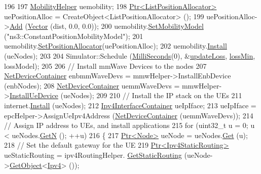 \begin{DoxyCode}
196 
197   \hyperlink{classns3_1_1MobilityHelper}{MobilityHelper} uemobility;
198   \hyperlink{classns3_1_1Ptr}{Ptr<ListPositionAllocator>} uePositionAlloc = 
      CreateObject<ListPositionAllocator> ();
199   uePositionAlloc->\hyperlink{classns3_1_1ListPositionAllocator_a460e82f015ac012a73ba0ea0cccb3486}{Add} (\hyperlink{classns3_1_1Vector3D_a7e59b47bc94c9cb1dadff68c1d0112d8}{Vector} (dist, 0.0, 0.0));
200   uemobility.\hyperlink{classns3_1_1MobilityHelper_a030275011b6f40682e70534d30280aba}{SetMobilityModel} (\textcolor{stringliteral}{"ns3::ConstantPositionMobilityModel"});
201   uemobility.\hyperlink{classns3_1_1MobilityHelper_ac59d5295076be3cc11021566713a28c5}{SetPositionAllocator}(uePositionAlloc);
202   uemobility.\hyperlink{classns3_1_1MobilityHelper_a07737960ee95c0777109cf2994dd97ae}{Install} (ueNodes);
203 
204   Simulator::Schedule (\hyperlink{group__timecivil_gaf26127cf4571146b83a92ee18679c7a9}{MilliSeconds}(0), &\hyperlink{mmwave-epc-amc-test_8cc_adfea4867a62217f5e5e9a8ff5e69a5ad}{updateLoss}, 
      \hyperlink{mmwave-epc-amc-test_8cc_a9ca00a53092f2e9430cb7f39c9831c11}{lossMin}, lossModel);
205 
206   \textcolor{comment}{// Install mmWave Devices to the nodes}
207   \hyperlink{classns3_1_1NetDeviceContainer}{NetDeviceContainer} enbmmWaveDevs = mmwHelper->InstallEnbDevice (enbNodes);
208   \hyperlink{classns3_1_1NetDeviceContainer}{NetDeviceContainer} uemmWaveDevs = mmwHelper->\hyperlink{classns3_1_1MmWaveHelper_a9311c819d7ee539c8710c5b7e98df37a}{InstallUeDevice} (ueNodes);
209 
210   \textcolor{comment}{// Install the IP stack on the UEs}
211   internet.\hyperlink{classns3_1_1InternetStackHelper_a6645b412f31283d2d9bc3d8a95cebbc0}{Install} (ueNodes);
212   \hyperlink{classns3_1_1Ipv4InterfaceContainer}{Ipv4InterfaceContainer} ueIpIface;
213   ueIpIface = epcHelper->AssignUeIpv4Address (\hyperlink{classns3_1_1NetDeviceContainer}{NetDeviceContainer} (uemmWaveDevs));
214   \textcolor{comment}{// Assign IP address to UEs, and install applications}
215   \textcolor{keywordflow}{for} (uint32\_t u = 0; u < ueNodes.\hyperlink{classns3_1_1NodeContainer_aed647ac56d0407a7706aba02eb44b951}{GetN} (); ++u)
216   \{
217         \hyperlink{classns3_1_1Ptr}{Ptr<Node>} ueNode = ueNodes.\hyperlink{classns3_1_1NodeContainer_a9ed96e2ecc22e0f5a3d4842eb9bf90bf}{Get} (u);
218         \textcolor{comment}{// Set the default gateway for the UE}
219         \hyperlink{classns3_1_1Ptr}{Ptr<Ipv4StaticRouting>} ueStaticRouting = ipv4RoutingHelper.
      \hyperlink{classns3_1_1Ipv4StaticRoutingHelper_a731206e50d305695dac7fb2ef963a4bb}{GetStaticRouting} (ueNode->\hyperlink{classns3_1_1Object_a13e18c00017096c8381eb651d5bd0783}{GetObject}<\hyperlink{classns3_1_1Ipv4}{Ipv4}> ());

\end{DoxyCode}
